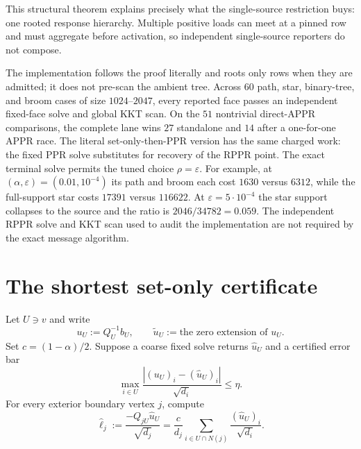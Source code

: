 This structural theorem explains precisely what the single-source
restriction buys: one rooted response hierarchy.  Multiple positive loads
can meet at a pinned row and must aggregate before activation, so independent
single-source reporters do not compose.

The implementation follows the proof literally and roots only rows when they
are admitted; it does not pre-scan the ambient tree.  Across $60$ path, star,
binary-tree, and broom cases of size $1024$--$2047$, every reported face passes
an independent fixed-face solve and global KKT scan.  On the $51$ nontrivial
direct-APPR comparisons, the complete lane wins $27$ standalone and $14$
after a one-for-one APPR race.  The literal set-only-then-PPR version has the
same charged work: the fixed PPR solve substitutes for recovery of the RPPR
point.  The exact terminal solve permits the tuned choice $\rho=\varepsilon$.
For example, at $(\alpha,\varepsilon)=(0.01,10^{-4})$ its path and broom each
cost $1630$ versus $6312$, while the full-support star costs $17391$ versus
$116622$.  At $\varepsilon=5\cdot10^{-4}$ the star support collapses to the
source and the ratio is $2046/34782=0.059$.  The independent RPPR solve and
KKT scan used to audit the implementation are not required by the exact
message algorithm.

\section{The shortest set-only certificate}

Let $U\ni v$ and write
\begin{equation}
 u_U:=Q_U^{-1}b_U,
 \qquad \widetilde u_U:=\text{the zero extension of }u_U.
 \label{eq:short-principal}
\end{equation}
Set $c=(1-\alpha)/2$.  Suppose a coarse fixed solve returns
$\widehat u_U$ and a certified error bar
\begin{equation}
 \max_{i\in U}\frac{|(u_U)_i-(\widehat u_U)_i|}{\sqrt{d_i}}
 \leq\eta.
 \label{eq:short-error-bar}
\end{equation}
For every exterior boundary vertex $j$, compute
\begin{equation}
 \widehat\ell_j
 :=\frac{-Q_{jU}\widehat u_U}{\sqrt{d_j}}
 =\frac{c}{d_j}\sum_{i\in U\cap N(j)}
       \frac{(\widehat u_U)_i}{\sqrt{d_i}}.
 \label{eq:short-leakage-estimate}
\end{equation}

